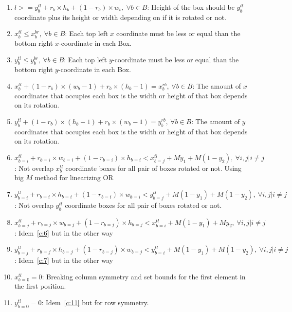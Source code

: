 \documentclass[12pt, a4paper]{article}
\begin{document}
\begin{enumerate}

  \item $l >= y_b^{tl} + r_b \times h_b + (1-r_b) \times w_b,\ \forall b \in B$: Height of the box should be $y_b^{tl}$ coordinate plus its height or width depending on if it is rotated or not.

  \item $x_b^{tl} \leq x_b^{br},\ \forall b \in B$: Each top left $x$ coordinate must be less or equal than the bottom right $x$-coordinate in each Box.

  \item $y_b^{tl} \leq y_b^{br},\ \forall b \in B$: Each top left $y$-coordinate must be less or equal than the bottom right $y$-coordinate in each Box.

  \item\label{c:4} $x_b^{tl} + (1-r_b) \times (w_b-1) + r_b \times (h_b-1) = x_b^{rb},\ \forall b \in B$: The amount of $x$ coordinates that occupies each box is the width or height of that box depends on its rotation.

  \item\label{c:5} $y_b^{tl} + (1-r_b) \times (h_b-1) + r_b \times (w_b-1) = y_b^{rb},\ \forall b \in B$: The amount of $y$ coordinates that occupies each box is the width or height of that box depends on its rotation.

  \item\label{c:6} $x_{b=i}^{tl} + r_{b=i} \times w_{b=i} + (1-r_{b=i}) \times h_{b=i} < x_{b=j}^{tl} + My_1 + M(1-y_2),\ \forall i,j | i \neq j$: Not overlap $x_b^{tl}$ coordinate boxes for all pair of boxes rotated or not. Using big $M$ method for linearizing OR

  \item\label{c:7} $y_{b=i}^{tl} + r_{b=i} \times h_{b=i} + (1-r_{b=i}) \times w_{b=i} < y_{b=j}^{tl} + M(1-y_1) + M(1-y_2),\ \forall i,j | i \neq j$: Not overlap $y_b^{tl}$ coordinate boxes for all pair of boxes rotated or not.

  \item $x_{b=j}^{tl} + r_{b=j} \times w_{b=j} + (1-r_{b=j}) \times h_{b=j} < x_{b=i}^{tl} + M(1 - y_1) + My_2,\ \forall i,j | i \neq j$: Idem~\ref{c:6} but in the other way

  \item $y_{b=j}^{tl} + r_{b=j} \times h_{b=j} + (1-r_{b=j}) \times w_{b=j} < y_{b=i}^{tl} + M(1- y_1) + M(1-y_2),\ \forall i,j | i \neq j$: Idem~\ref{c:7} but in the other way

  \item\label{c:11} $x_{b=0}^{tl} = 0$: Breaking column symmetry and set bounds for the first element in the first position.

  \item $y_{b=0}^{tl} = 0$: Idem~\ref{c:11} but for row symmetry.

\end{enumerate}
\end{document}
